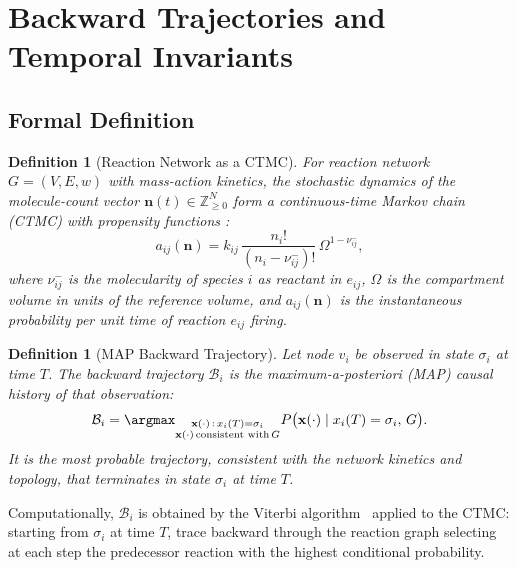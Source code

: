 \documentclass[twocolumn,10pt,a4paper]{article}
\newcommand{\Back}{\mathcal{B}}
\newtheorem{definition}[theorem]{Definition}
\begin{document}
\section{Backward Trajectories and Temporal Invariants}
\label{sec:backward}

\subsection{Formal Definition}
\label{sec:backward-def}

\begin{definition}[Reaction Network as a CTMC]
\label{def:markov}
For reaction network $G=(V,E,w)$ with mass-action kinetics, the stochastic
dynamics of the molecule-count vector $\mathbf{n}(t)\in\mathbb{Z}_{\geq 0}^N$
form a continuous-time Markov chain (CTMC) with propensity functions
\cite{Gillespie1977,vanKampen2007}:
\begin{equation}
  a_{ij}(\mathbf{n}) = k_{ij}\,\frac{n_i!}{(n_i-\nu^-_{ij})!}\,
    \Omega^{1-\nu^-_{ij}},
  \label{eq:propensity}
\end{equation}
where $\nu^-_{ij}$ is the molecularity of species $i$ as reactant in $e_{ij}$,
$\Omega$ is the compartment volume in units of the reference volume, and
$a_{ij}(\mathbf{n})$ is the instantaneous probability per unit time of
reaction $e_{ij}$ firing.
\end{definition}

\begin{definition}[MAP Backward Trajectory]
\label{def:backward-traj}
Let node $v_i$ be observed in state $\sigma_i$ at time $T$.  The
\emph{backward trajectory} $\Back_i$ is the maximum-a-posteriori (MAP) causal
history of that observation:
\begin{equation}
  \Back_i = \argmax_{\substack{\mathbf{x}(\cdot)\,:\,x_i(T)=\sigma_i\\
    \mathbf{x}(\cdot)\,\text{consistent with}\,G}}
  P\bigl(\mathbf{x}(\cdot)\mid x_i(T)=\sigma_i,\,G\bigr).
  \label{eq:backward-traj}
\end{equation}
It is the most probable trajectory, consistent with the network kinetics and
topology, that terminates in state $\sigma_i$ at time $T$.
\end{definition}

Computationally, $\Back_i$ is obtained by the Viterbi
algorithm~\cite{Viterbi1967,Forney1973} applied to the CTMC: starting from
$\sigma_i$ at time $T$, trace backward through the reaction graph selecting
at each step the predecessor reaction with the highest conditional probability.
\end{document}
